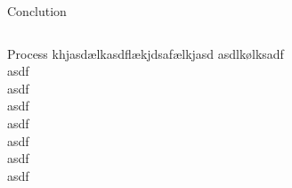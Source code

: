 \documentclass{beamer}
\newenvironment{pblock}{\begin{minipage}[b]{\linewidth}
	\begin{block}}{\end{block} 	\end{minipage}\vspace*{20pt}}
\begin{document}
{\begin{columns}[t]
\begin{column}{.3\linewidth}
\begin{pblock}{Conclution}
    	\end{pblock}
    
    \end{column}
  \end{columns}
\hspace{.015\linewidth}
  \begin{minipage}{.97\linewidth}
  \begin{block}{Process}
  khjasdælkasdflækjdsafælkjasd
  asdlkølksadf\\
  asdf\\
  asdf\\
  asdf\\
  asdf\\
   asdf\\ 
   asdf\\
     asdf\\
  
  \end{block}
  \end{minipage}
  }
\end{document}
